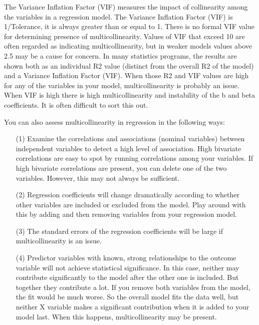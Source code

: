 \documentclass[a4paper,12pt]{article}
\begin{document}
The Variance Inflation Factor (VIF) measures the impact of collinearity among the variables in a regression model. The Variance Inflation Factor (VIF) is 1/Tolerance, it is always greater than or equal to 1. There is no formal VIF value for determining presence of multicollinearity. Values of VIF that exceed 10 are often regarded as indicating multicollinearity, but in weaker models values above 2.5 may be a cause for concern. In many statistics programs, the results are shown both as an individual R2 value (distinct from the overall R2 of the model) and a Variance Inflation Factor (VIF). When those R2 and VIF values are high for any of the variables in your model, multicollinearity is probably an issue. When VIF is high there is high multicollinearity and instability of the b and beta coefficients. It is often difficult to sort this out. \\

\bigskip

You can also assess multicollinearity in regression in the following ways:

\begin{itemize}
	\item [(1)] Examine the correlations and associations (nominal variables) between independent variables to detect a high level of association. High bivariate correlations are easy to spot by running correlations among your variables. If high bivariate correlations are present, you can delete one of the two variables. However, this may not always be sufficient.
	
	\item [(2)] Regression coefficients will change dramatically according to whether other variables are included or excluded from the model. Play around with this by adding and then removing variables from your regression model.
	
	\item [(3)] The standard errors of the regression coefficients will be large if multicollinearity is an issue.
	
	\item [(4)] Predictor variables with known, strong relationships to the outcome variable will not achieve statistical significance. In this case, neither may contribute significantly to the model after the other one is included. But together they contribute a lot. If you remove both variables from the model, the fit would be much worse. So the overall model fits the data well, but neither X variable makes a significant contribution when it is added to your model last. When this happens, multicollinearity may be present.
	
\end{itemize}
%
\end{document}
